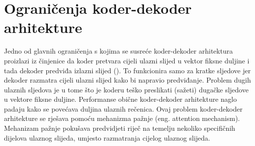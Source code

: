 \documentclass[times, utf8, zavrsni, numeric]{fer}
\begin{document}
\section{Ograničenja koder-dekoder arhitekture}
Jedno od glavnih ograničenja s kojima se susreće koder-dekoder arhitektura proizlazi iz činjenice da koder pretvara cijeli ulazni slijed u vektor fiksne duljine i tada dekoder predviđa izlazni slijed (\citet{article3}). To funkcionira samo za kratke sljedove jer dekoder razmatra cijeli ulazni slijed kako bi napravio predviđanje.
Problem dugih ulaznih sljedova je u tome što je koderu teško preslikati (sažeti) dugačke sljedove u vektore fiksne duljine.
Performanse obične koder-dekoder arhitekture naglo padaju kako se povećava duljina ulaznih rečenica.
Ovaj problem koder-dekoder arhitekture se rješava pomoću mehanizma pažnje (eng. attention mechanism).
Mehanizam pažnje pokušava predvidjeti riječ na temelju nekoliko specifičnih dijelova ulaznog slijeda, umjesto razmatranja cijelog ulaznog slijeda.
\end{document}
